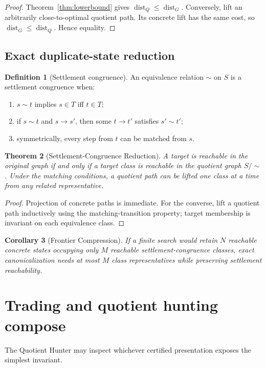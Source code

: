 \documentclass[11pt]{article}
\newtheorem{theorem}{Theorem}[section]
\newtheorem{corollary}[theorem]{Corollary}
\theoremstyle{definition}
\newtheorem{definition}[theorem]{Definition}
\theoremstyle{remark}
\newcommand{\dist}{\operatorname{dist}}
\begin{document}
\begin{proof}
Theorem~\ref{thm:lowerbound} gives $\dist_Q\le\dist_G$. Conversely, lift an arbitrarily close-to-optimal quotient path. Its concrete lift has the same cost, so $\dist_G\le\dist_Q$. Hence equality.
\end{proof}

\subsection{Exact duplicate-state reduction}
\begin{definition}[Settlement congruence]
An equivalence relation $\sim$ on $S$ is a settlement congruence when:
\begin{enumerate}[label=(\roman*)]
\item $s\sim t$ implies $s\in T$ iff $t\in T$;
\item if $s\sim t$ and $s\to s'$, then some $t\to t'$ satisfies $s'\sim t'$;
\item symmetrically, every step from $t$ can be matched from $s$.
\end{enumerate}
\end{definition}

\begin{theorem}[Settlement-Congruence Reduction]
A target is reachable in the original graph if and only if a target class is reachable in the quotient graph $S/{\sim}$. Under the matching conditions, a quotient path can be lifted one class at a time from any related representative.
\end{theorem}

\begin{proof}
Projection of concrete paths is immediate. For the converse, lift a quotient path inductively using the matching-transition property; target membership is invariant on each equivalence class.
\end{proof}

\begin{corollary}[Frontier Compression]
If a finite search would retain $N$ reachable concrete states occupying only $M$ reachable settlement-congruence classes, exact canonicalization needs at most $M$ class representatives while preserving settlement reachability.
\end{corollary}

\section{Trading and quotient hunting compose}
The Quotient Hunter may inspect whichever certified presentation exposes the simplest invariant.
\end{document}
